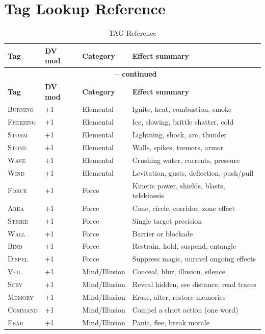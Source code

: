 \documentclass[10pt,a5paper]{book}
\newcommand{\tag}[1]{\textsc{#1}}
\begin{document}
\section{Tag Lookup Reference}

\begin{longtable}{@{} p{2.5cm} p{1.2cm} p{2.5cm} p{6cm} @{}}
\caption{TAG Reference}\\
\toprule
\textbf{Tag} & \textbf{DV mod} & \textbf{Category} & \textbf{Effect summary} \\
\midrule
\endfirsthead
\multicolumn{4}{c}{{\bfseries \tablename\ \thetable{} -- continued}} \\
\toprule
\textbf{Tag} & \textbf{DV mod} & \textbf{Category} & \textbf{Effect summary} \\
\midrule
\endhead
\bottomrule
\endfoot

\tag{Burning} & +1 & Elemental & Ignite, heat, combustion, smoke \\
\tag{Freezing} & +1 & Elemental & Ice, slowing, brittle shatter, cold \\
\tag{Storm} & +1 & Elemental & Lightning, shock, arc, thunder \\
\tag{Stone} & +1 & Elemental & Walls, spikes, tremors, armor \\
\tag{Wave} & +1 & Elemental & Crushing water, currents, pressure \\
\tag{Wind} & +1 & Elemental & Levitation, gusts, deflection, push/pull \\
\midrule

\tag{Force} & +1 & Force & Kinetic power, shields, blasts, telekinesis \\
\tag{Area} & +1 & Force & Cone, circle, corridor, zone effect \\
\tag{Strike} & +1 & Force & Single target precision \\
\tag{Wall} & +1 & Force & Barrier or blockade \\
\tag{Bind} & +1 & Force & Restrain, hold, suspend, entangle \\
\tag{Dispel} & +1 & Force & Suppress magic, unravel ongoing effects \\
\midrule

\tag{Veil} & +1 & Mind/Illusion & Conceal, blur, illusion, silence \\
\tag{Scry} & +1 & Mind/Illusion & Reveal hidden, see distance, read traces \\
\tag{Memory} & +1 & Mind/Illusion & Erase, alter, restore memories \\
\tag{Command} & +1 & Mind/Illusion & Compel a short action (one word) \\
\tag{Fear} & +1 & Mind/Illusion & Panic, flee, break morale \\
\midrule


\end{longtable}
\end{document}
